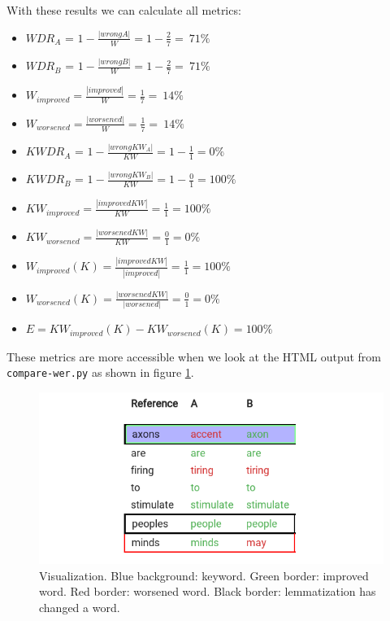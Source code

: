 \documentclass[]{article}
\providecommand{\tightlist}{%
  \setlength{\itemsep}{0pt}\setlength{\parskip}{0pt}}
\begin{document}
With these results we can calculate all metrics:

\begin{itemize}
\tightlist
\item
  \(WDR_A\) = \(1 - \frac{|wrongA|}{W} = 1 - \frac{2}{7} = ~71\%\)
\item
  \(WDR_B\) = \(1 - \frac{|wrongB|}{W} = 1 - \frac{2}{7} = ~71\%\)
\item
  \(W_{improved} = \frac{|improved|}{W} = \frac{1}{7} = ~14\%\)
\item
  \(W_{worsened} = \frac{|worsened|}{W} = \frac{1}{7} = ~14\%\)
\item
  \(KWDR_A\) = \(1 - \frac{|wrongKW_A|}{KW} = 1 - \frac{1}{1} = 0\%\)
\item
  \(KWDR_B\) = \(1 - \frac{|wrongKW_B|}{KW} = 1 - \frac{0}{1} = 100\%\)
\item
  \(KW_{improved} = \frac{|improvedKW|}{KW} = \frac{1}{1} = 100\%\)
\item
  \(KW_{worsened} = \frac{|worsenedKW|}{KW} = \frac{0}{1} = 0\%\)
\item
  \(W_{improved}(K) = \frac{|improvedKW|}{|improved|} = \frac{1}{1} = 100\%\)
\item
  \(W_{worsened}(K) = \frac{|worsenedKW|}{|worsened|} = \frac{0}{1} = 0\%\)
\item
  \(E = KW_{improved}(K) - KW_{worsened}(K) = 100\%\)
\end{itemize}

These metrics are more accessible when we look at the HTML output from
\texttt{compare-wer.py} as shown in figure \ref{viz-html-words}.

\begin{figure}[H]
\label{viz-html-words}
\centering
\includegraphics{images/analysis_150.png}
\caption{Visualization. Blue background: keyword. Green border: improved word. Red border: worsened word. Black border: lemmatization has changed a word.}
\end{figure}
\end{document}
